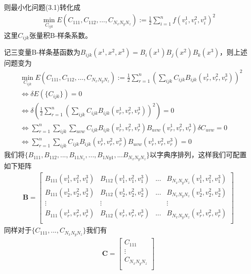 则最小化问题(3.1)转化成
\begin{equation}
    \begin{split}
        \min_{C_{ijk}}E(C_{111},C_{112},...,C_{N_xN_yN_z}):=\frac{1}{2}\sum_{i = 1}^{n} f(v_i^1,v_i^2,v_i^3)^2 
    \end{split}
\end{equation}
这里$C_{ijk}$张量积B-样条系数。

记三变量B-样条基函数为$B_{ijk}(x^1,x^2,x^3) = B_i(x^1)B_j(x^2)B_k(x^3)$，则上述问题变为
\begin{equation}
    \begin{split}
        &\min_{C_{ijk}}E(C_{111},C_{112},...,C_{N_xN_yN_z}):= \frac{1}{2}\sum_{r = 1}^{n} (\sum_{ijk}C_{ijk}B_{ijk}(v_r^1,v_r^2,v_r^3))^2 \\
        &\Leftrightarrow \delta E(\{C_{ijk}\}) = 0\\
        &\Leftrightarrow \delta (\frac{1}{2}\sum_{r = 1}^{n} (\sum_{ijk}C_{ijk}B_{ijk}(v_r^1,v_r^2,v_r^3))^2) = 0\\
        &\Leftrightarrow \sum_{r = 1}^{n} \sum_{ijk} \sum_{uvw}C_{ijk}B_{ijk}(v_r^1,v_r^2,v_r^3)B_{uvw}(v_r^1,v_r^2,v_r^3)\delta C_{uvw} = 0\\
        &\Leftrightarrow \sum_{r = 1}^n \sum_{ijk} C_{ijk} B_{ijk}(v_r^1,v_r^2,v_r^3)B_{uvw}(v_r^1,v_r^2,v_r^3) = 0
    \end{split}
\end{equation}
我们将$\{B_{111},B_{112},...,B_{11N_z},...,B_{1Ny1},...B_{N_xN_yN_z}\}$以字典序排列，这样我们可配置如下矩阵
\begin{align*}
    \mathbf{B} = \begin{bmatrix}
        B_{111}(v_1^1,v_1^2,v_1^3) & B_{112}(v_1^1,v_1^2,v_1^3) &...& B_{N_xN_yN_z}(v_1^1,v_1^2,v_1^3)\\
        B_{111}(v_2^1,v_2^2,v_2^3) & B_{112}(v_2^1,v_2^2,v_2^3) &...& B_{N_xN_yN_z}(v_2^1,v_2^2,v_2^3)\\
         \vdots & \vdots & & \vdots\\
        B_{111}(v_r^1,v_r^2,v_r^3) & B_{112}(v_r^1,v_r^2,v_r^3) &...& B_{N_xN_yN_z}(v_r^1,v_r^2,v_r^3)\\
    \end{bmatrix}
\end{align*}
同样对于$\{C_{111},...,C_{N_xN_yN_z}\}$我们有
\begin{align*}
    \mathbf{C} = \begin{bmatrix}
        C_{111} \\
        \vdots \\
        C_{N_xN_yN_z}\\
    \end{bmatrix}
\end{align*}
